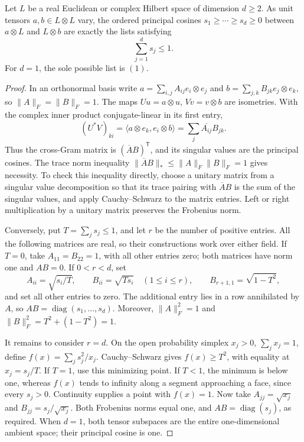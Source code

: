 \begin{theorem}
Let \(L\) be a real Euclidean or complex Hilbert space of dimension
\(d\geq2\). As unit tensors \(a,b\in L\otimes L\) vary, the ordered
principal cosines \(s_1\geq\cdots\geq s_d\geq0\) between
\(a\otimes L\) and \(L\otimes b\) are exactly the lists satisfying
\[
                  \sum_{j=1}^d s_j\leq1.
\]
For \(d=1\), the sole possible list is \((1)\).
\end{theorem}
\begin{proof}
In an orthonormal basis write
\(a=\sum_{i,j}A_{ij}e_i\otimes e_j\) and
\(b=\sum_{j,k}B_{jk}e_j\otimes e_k\), so
\(\|A\|_F=\|B\|_F=1\).
The maps \(Uu=a\otimes u\), \(Vv=v\otimes b\) are isometries.
With the complex inner product conjugate-linear in its first entry,
\[
 (U^*V)_{ki}=\langle a\otimes e_k,e_i\otimes b\rangle
            =\sum_j\overline{A_{ij}}B_{jk}.
\]
Thus the cross-Gram matrix is \((\overline A B)^{\mathsf T}\),
and its singular values are the principal cosines. The trace norm
inequality
\(\|\overline A B\|_*\leq\|A\|_F\|B\|_F=1\)
gives necessity. To check this inequality directly, choose a unitary
matrix from a singular value decomposition so that its trace pairing
with \(\overline A B\) is the sum of the singular values, and apply
Cauchy--Schwarz to the matrix entries. Left or right multiplication
by a unitary matrix preserves the Frobenius norm.

Conversely, put \(T=\sum_js_j\leq1\), and let \(r\) be the number
of positive entries. All the following matrices are real, so their
constructions work over either field. If \(T=0\), take
\(A_{11}=B_{22}=1\), with all other entries zero;
both matrices have norm one and \(AB=0\).
If \(0<r<d\), set
\[
 A_{ii}=\sqrt{s_i/T},\qquad B_{ii}=\sqrt{Ts_i}
 \quad(1\leq i\leq r),\qquad
 B_{r+1,1}=\sqrt{1-T^2},
\]
and set all other entries to zero. The additional entry lies in a
row annihilated by \(A\), so
\(AB=\operatorname{diag}(s_1,\ldots,s_d)\).
Moreover, \(\|A\|_F^2=1\) and
\(\|B\|_F^2=T^2+(1-T^2)=1\).

It remains to consider \(r=d\). On the open probability simplex
\(x_j>0\), \(\sum_jx_j=1\), define
\(f(x)=\sum_js_j^2/x_j\). Cauchy--Schwarz gives \(f(x)\geq T^2\),
with equality at \(x_j=s_j/T\).
If \(T=1\), use this minimizing point. If \(T<1\), the minimum
is below one, whereas \(f(x)\) tends to infinity along a segment
approaching a face, since every \(s_j>0\).
Continuity supplies a point with \(f(x)=1\).
Now take \(A_{jj}=\sqrt{x_j}\) and
\(B_{jj}=s_j/\sqrt{x_j}\). Both Frobenius norms equal one, and
\(AB=\operatorname{diag}(s_j)\), as required.
When \(d=1\), both tensor subspaces are the entire one-dimensional
ambient space; their principal cosine is one.
\end{proof}

